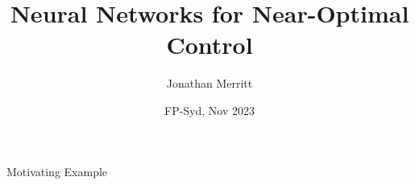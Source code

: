 \documentclass{beamer}
\title{Neural Networks for Near-Optimal Control}
\author{Jonathan Merritt}
\date{FP-Syd, Nov 2023}
\begin{document}
\maketitle

\begin{frame}{Motivating Example}

\end{frame}
\end{document}
